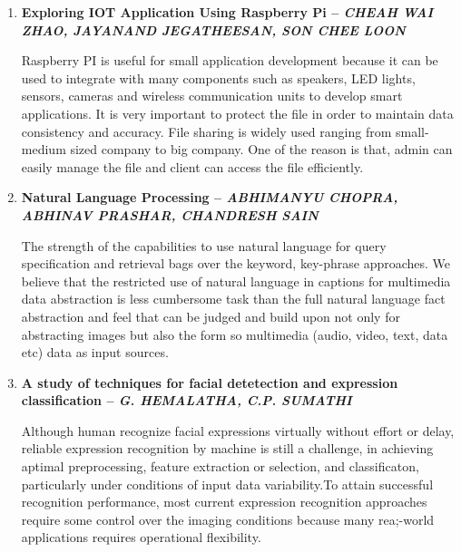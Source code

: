 \documentclass[16pt,oneside,a4paper]{article}
\begin{document}
\begin{enumerate}
\item \textbf{Exploring IOT Application Using Raspberry Pi -- \textit{CHEAH WAI ZHAO, JAYANAND JEGATHEESAN, SON CHEE LOON}}

Raspberry PI is useful for small application development because it can be used to integrate with many components such as speakers, LED lights, sensors, cameras and wireless communication units to develop smart applications. It is very important to protect the file in order to maintain data consistency and accuracy. File sharing is widely used ranging from small-medium sized company to big company. One of the reason is that, admin can easily manage the file and client can access the file efficiently.\\

\pagebreak

\item \textbf{Natural Language Processing -- \textit{ABHIMANYU CHOPRA, ABHINAV PRASHAR, CHANDRESH SAIN}}

The strength of the capabilities to use natural language for query specification and retrieval bags over the keyword, key-phrase approaches. We believe that the restricted use of natural language in captions for multimedia data abstraction is less cumbersome task than the full natural language fact abstraction and feel that can be judged and build upon not only for abstracting images but also the form so multimedia (audio, video, text, data etc) data as input sources.\\

\item \textbf{A study of techniques for facial detetection and expression classification -- \textit{G. HEMALATHA, C.P. SUMATHI}}

Although human recognize facial expressions virtually without effort or delay, reliable expression recognition by machine is still a challenge, in achieving aptimal preprocessing, feature extraction or selection, and classificaton, particularly under conditions of input data variability.To attain successful recognition performance, most current expression recognition approaches require some control over the imaging conditions because many rea;-world applications requires operational flexibility.\\

\end{enumerate}
\end{document}

